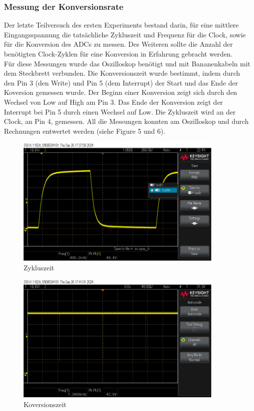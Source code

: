 \documentclass[a4paper,12pt]{article}
\begin{document}
\subsubsection*{Messung der Konversionsrate}
Der letzte Teilversuch des ersten Experiments bestand darin, für eine mittlere Eingangsspannung die tatsächliche Zykluszeit und Frequenz für die Clock, sowie für die Konversion des ADCs zu messen. Des Weiteren sollte die Anzahl der benötigten Clock-Zyklen für eine Konversion in Erfahrung gebracht werden.\\
Für diese Messungen wurde das Oszilloskop benötigt und mit Bananenkabeln mit dem Steckbrett verbunden. Die Konversionszeit wurde bestimmt, indem durch den Pin 3 (den Write) und Pin 5 (dem Interrupt) der Start und das Ende der Koversion gemessen wurde. Der Beginn einer Konversion zeigt sich durch den Wechsel von Low auf High am Pin 3. Das Ende der Konversion zeigt der Interrupt bei Pin 5 durch einen Wechsel auf Low. Die Zykluszeit wird an der Clock, an Pin 4, gemessen. All die Messungen konnten am Oszilloskop und durch Rechnungen entwertet werden (siehe Figure 5 und 6).


\begin{figure}[H]
    \centering
    \includegraphics[width=0.9\textwidth]{../Quellen/Labor1/Versuch1/scope_0.png}
    \caption{Zykluszeit}
\end{figure}


\begin{figure}[H]
    \centering
    \includegraphics[width=0.9\textwidth]{../Quellen/Labor1/Versuch1/scope_1.png}
    \caption{Koversionszeit}
\end{figure}
\end{document}

